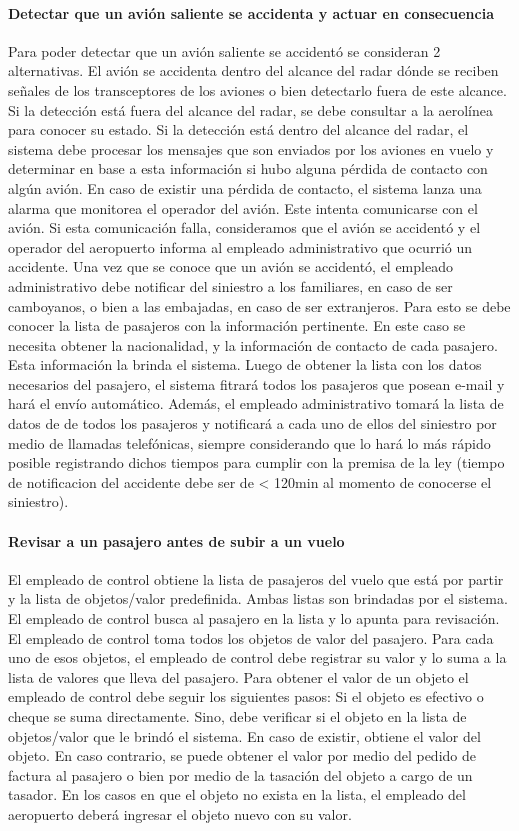 \paragraph{Detectar que un avión saliente se accidenta y actuar en consecuencia}
Para poder detectar que un avión saliente se accidentó se consideran 2 alternativas.
El avión se accidenta dentro del alcance del radar dónde se reciben señales de los
transceptores de los aviones o bien detectarlo fuera de este alcance.
Si la detección está fuera del alcance del radar, se debe consultar a la aerolínea
para conocer su estado.
Si la detección está dentro del alcance del radar, el sistema debe procesar los mensajes
que son enviados por los aviones en vuelo y determinar en base a esta información si
hubo alguna pérdida de contacto con algún avión. En caso de existir una pérdida de contacto,
el sistema lanza una alarma que monitorea el operador del avión. Este intenta 
comunicarse con el avión. Si esta comunicación falla, consideramos que el avión se accidentó y
el operador del aeropuerto informa al empleado administrativo que ocurrió un accidente.
Una vez que se conoce que un avión se accidentó, el empleado administrativo debe notificar 
del siniestro a los familiares, en caso de ser camboyanos, o bien a las embajadas, en caso 
de ser extranjeros.
Para esto se debe conocer la lista de pasajeros con la información pertinente. En este
caso se necesita obtener la nacionalidad, y la información de contacto de cada pasajero.
Esta información la brinda el sistema. 
Luego de obtener la lista con los datos necesarios del pasajero, el sistema fitrará
todos los pasajeros que posean e-mail y hará el envío automático. Además, el empleado
administrativo tomará la lista de datos de de todos los pasajeros y notificará a cada uno 
de ellos del siniestro por medio de llamadas telefónicas, siempre considerando que lo hará
lo más rápido posible registrando dichos tiempos para cumplir con la premisa de la ley (tiempo
de notificacion del accidente debe ser de < 120min al momento de conocerse el siniestro).


\paragraph{Revisar a un pasajero antes de subir a un vuelo}
El empleado de control obtiene la lista de pasajeros del vuelo que está por partir y la lista de 
objetos/valor predefinida. Ambas listas son brindadas por el sistema.
El empleado de control busca al pasajero en la lista y lo apunta para revisación.
El empleado de control toma todos los objetos de valor del pasajero.
Para cada uno de esos objetos, el empleado de control debe registrar su valor y lo suma
a la lista de valores que lleva del pasajero.
Para obtener el valor de un objeto el empleado de control debe seguir los siguientes pasos:
Si el objeto es efectivo o cheque se suma directamente. Sino, debe verificar si el objeto en
la lista de objetos/valor que le brindó el sistema. En caso de existir, obtiene el valor del
objeto. En caso contrario, se puede obtener el valor por medio del pedido de factura al pasajero 
o bien por medio de la tasación del objeto a cargo de un tasador.
En los casos en que el objeto no exista en la lista, el empleado del aeropuerto deberá ingresar 
el objeto nuevo con su valor.

